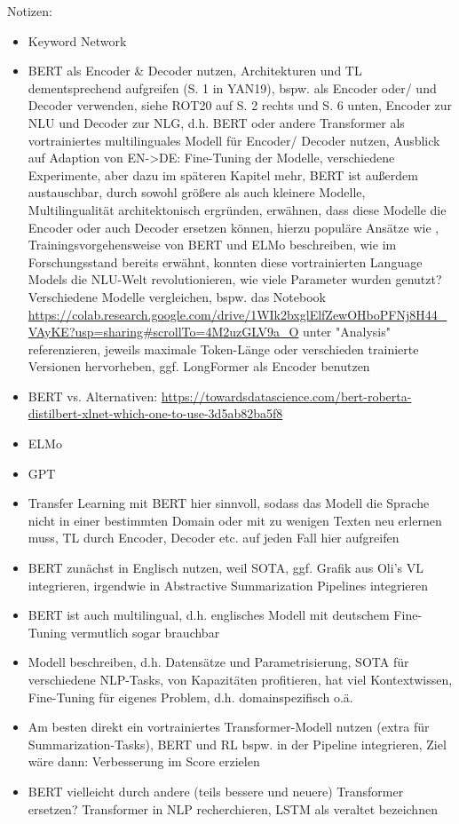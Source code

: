 Notizen:
\begin{itemize}
	\item Keyword Network
	\item BERT als Encoder \& Decoder nutzen, Architekturen und TL dementsprechend aufgreifen (S. 1 in YAN19), bspw. als Encoder oder/ und Decoder verwenden, siehe ROT20 auf S. 2 rechts und S. 6 unten, Encoder zur NLU und Decoder zur NLG, d.h. BERT oder andere Transformer als vortrainiertes multilinguales Modell für Encoder/ Decoder nutzen, Ausblick auf Adaption von EN->DE: Fine-Tuning der Modelle, verschiedene Experimente, aber dazu im späteren Kapitel mehr, BERT ist außerdem austauschbar, durch sowohl größere als auch kleinere Modelle, Multilingualität architektonisch ergründen, erwähnen, dass diese Modelle die Encoder oder auch Decoder ersetzen können, hierzu populäre Ansätze wie \cite{ROT20}, Trainingsvorgehensweise von BERT und ELMo beschreiben, wie im Forschungsstand bereits erwähnt, konnten diese vortrainierten Language Models die NLU-Welt revolutionieren, wie viele Parameter wurden genutzt? Verschiedene Modelle vergleichen, bspw. das Notebook \url{https://colab.research.google.com/drive/1WIk2bxglElfZewOHboPFNj8H44_VAyKE?usp=sharing#scrollTo=4M2uzGLV9a_O} unter "Analysis" referenzieren, jeweils maximale Token-Länge oder verschieden trainierte Versionen hervorheben, ggf. LongFormer als Encoder benutzen
	\item BERT vs. Alternativen: \url{https://towardsdatascience.com/bert-roberta-distilbert-xlnet-which-one-to-use-3d5ab82ba5f8}
	\item ELMo
	\item GPT
	\item Transfer Learning mit BERT hier sinnvoll, sodass das Modell die Sprache nicht in einer bestimmten Domain oder mit zu wenigen Texten neu erlernen muss, TL durch Encoder, Decoder etc. auf jeden Fall hier aufgreifen
	\item BERT zunächst in Englisch nutzen, weil SOTA, ggf. Grafik aus Oli's VL integrieren, irgendwie in Abstractive Summarization Pipelines integrieren
	\item BERT ist auch multilingual, d.h. englisches Modell mit deutschem Fine-Tuning vermutlich sogar brauchbar
	\item Modell beschreiben, d.h. Datensätze und Parametrisierung, SOTA für verschiedene NLP-Tasks, von Kapazitäten profitieren, hat viel Kontextwissen, Fine-Tuning für eigenes Problem, d.h. domainspezifisch o.ä.
	\item Am besten direkt ein vortrainiertes Transformer-Modell nutzen (extra für Summarization-Tasks), BERT und RL bspw. in der Pipeline integrieren, Ziel wäre dann: Verbesserung im Score erzielen
	\item BERT vielleicht durch andere (teils bessere und neuere) Transformer ersetzen? Transformer in NLP recherchieren, LSTM als veraltet bezeichnen
\end{itemize}

